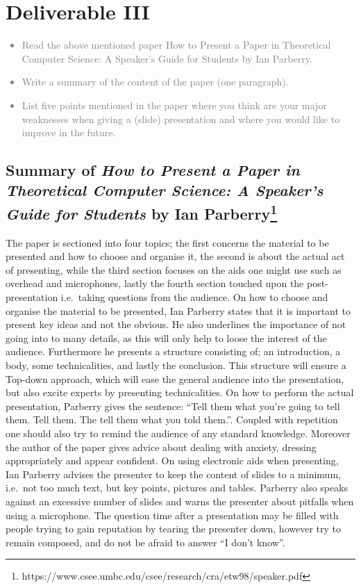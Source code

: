 \chapter{Deliverable III}
\textcolor{gray}{%
\begin{itemize}
    \item Read the above mentioned paper How to Present a Paper in Theoretical Computer Science: A Speaker’s Guide for Students by Ian Parberry.
    \item Write a summary of the content of the paper (one paragraph).
    \item List five points mentioned in the paper where you think are your major weaknesses when giving a (slide) presentation and where you would like to improve in the future.
\end{itemize}}
\section{Summary of \textit{How to Present a Paper in Theoretical Computer Science: A Speaker’s Guide for Students} by Ian Parberry\footnote{https://www.csee.umbc.edu/csee/research/cra/etw98/speaker.pdf}}
The paper is sectioned into four topics; the first concerns the material to be presented and how to choose and organise it, the second is about the actual act of presenting, while the third section focuses on the aids one might use such as overhead and microphones, lastly the fourth section touched upon the post-presentation i.e.\ taking questions from the audience.
On how to choose and organise the material to be presented, Ian Parberry states that it is important to present key ideas and not the obvious.
He also underlines the importance of not going into to many details, as this will only help to loose the interest of the audience.
Furthermore he presents a structure consisting of; an introduction, a body, some technicalities, and lastly the conclusion.
This structure will ensure a Top-down approach, which will ease the general audience into the presentation, but also excite experts by presenting technicalities.
On how to perform the actual presentation, Parberry gives the sentence: \enquote{Tell them what you're going to tell them. Tell them. The tell them what you told them.}.
Coupled with repetition one should also try to remind the audience of any standard knowledge.
Moreover the author of the paper gives advice about dealing with anxiety, dressing appropriately and appear confident.
On using electronic aids when presenting, Ian Parberry advises the presenter to keep the content of slides to a minimum, i.e.\ not too much text, but key points, pictures and tables.
Parberry also speaks against an excessive number of slides and warns the presenter about pitfalls when using a microphone.
The question time after a presentation may be filled with people trying to gain reputation by tearing the presenter down, however try to remain composed, and do not be afraid to answer \enquote{I don't know}.
